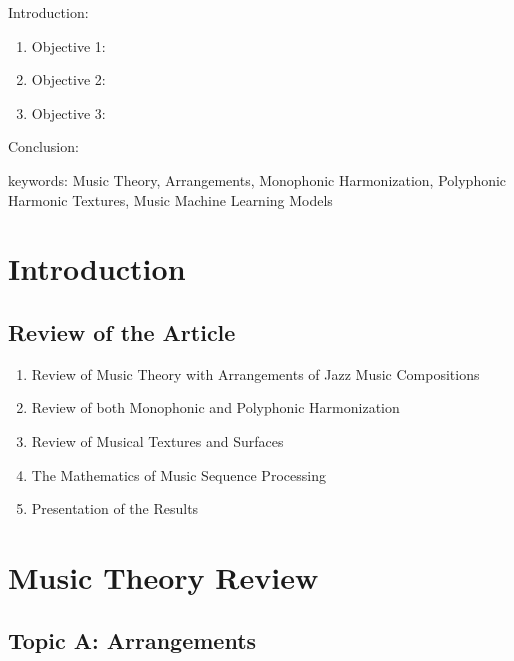 


\twocolumn
\scriptsize
\begin{frontmatter}
		\title{}
		\author{}
		\address{The Mathematical Learning Space}
\end{frontmatter}	

Introduction:
\begin{enumerate}
\item Objective 1:
\item Objective 2:
\item Objective 3:
\end{enumerate}
Conclusion:

keywords: Music Theory, Arrangements, Monophonic Harmonization, Polyphonic Harmonic Textures, Music Machine Learning Models

\section{Introduction}


\subsection{Review of the Article}

\begin{enumerate}
\item Review of Music Theory with Arrangements of Jazz Music Compositions
\item Review of both Monophonic and Polyphonic Harmonization
\item Review of Musical Textures and Surfaces
\item The Mathematics of Music Sequence Processing
\item Presentation of the Results
\end{enumerate}

\section{Music Theory Review}

\subsection{Topic A: Arrangements}

